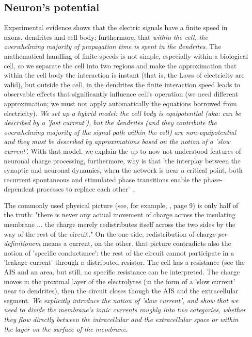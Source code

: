 \subsection{Neuron's potential\label{sec:Single-AbstractPotentialInside}}
Experimental evidence shows that the electric signals
have a finite speed in axons, dendrites and cell body; furthermore, that \textit{within the cell,
the overwhelming majority of propagation time is spent in the dendrites}.
The mathematical handling of finite speeds is not simple, especially
within a biological cell, so we separate the cell into two regions
and make the approximation that within the cell body the interaction is instant
(that is, the Laws of electricity are valid), but outside the cell, in the dendrites
the finite interaction speed leads to observable effects that significantly
influence cell's operation (we need different approximation; we must not apply
automatically the equations borrowed from electricity).
\textit{We set up a hybrid model: the cell body is equipotential
(aka: can be described by a 'fast current'), but the dendrites
(and they contribute the overwhelming majority of the signal path within the cell)
are non-equipotential and they must be described by approximations
based on the notion of a 'slow current'.}
With that model, we explain the up to now not understood features of neuronal
charge processing, furthermore, why is that 'the interplay
between the synaptic and neuronal dynamics, when the network is near
a critical point, both recurrent spontaneous and stimulated phase
transitions enable the phase-dependent processes to replace each other'
\cite{BiologicalConservationLaw:2017}.


The commonly used physical picture (see, for example, \cite{KochBiophysics:1999}, page 9)
is only half of the truth:
"there is never any actual movement of charge across the insulating membrane ...
the charge merely redistributes itself across the two sides by the way of the rest of the circuit."
On the one side, redistribution of charge \textit{per definitionem} means a current, on the other,
that picture contradicts also the notion of 'specific conductance':
the rest of the circuit cannot participate in a 'leakage current' through a distributed resistor.
The cell has a resistance (see the \gls{AIS}
and an area, but still, no specific resistance
can be interpreted.
The charge moves in  the proximal layer
 of the electrolytes
(in the form of a '{slow current}'
 near to dendrites),
then the circuit closes though the \gls{AIS} and  the extracellular segment.
\textit{We explicitly introduce the notion of 'slow current', and show that we need to divide the membrane's ionic currents roughly into two categories,
whether they flow directly between the intracellular and the extracellular
space or within the layer on the surface of the membrane}.

